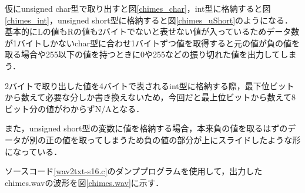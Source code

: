 \documentclass[titlepage]{jarticle}
\begin{document}
仮にunsigned char型で取り出すと図\ref{chimes_char}，int型に格納すると図\ref{chimes_int}，unsigned short型に格納すると図\ref{chimes_uShort}のようになる．
基本的にLの値もRの値も2バイトでないと表せない値が入っているためデータ数が1バイトしかないchar型に合わせ1バイトずつ値を取得すると元の値が負の値を取る場合や255以下の値を持つときに0や255などの振り切れた値を出力してしまう．

2バイトで取り出した値を4バイトで表されるint型に格納する際，最下位ビットから数えて必要な分しか書き換えないため，今回だと最上位ビットから数えて8ビット分の値がわからずN/Aとなる．

また，unsigned short型の変数に値を格納する場合，本来負の値を取るはずのデータが別の正の値を取ってしまうため負の値の部分が上にスライドしたような形になっている．

ソースコード\ref{wav2txt-s16.c}のダンププログラムを使用して，出力したchimes.wavの波形を図\ref{chimes.wav}に示す．
\end{document}
